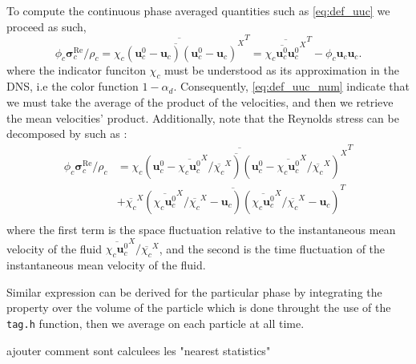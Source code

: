 \documentclass[12pt]{My_preprint}
\newcommand{\avgcond}[1]{\overline{#1}}
\newcommand{\Tavg}[1]{\avgcond{#1}^T}
\newcommand{\Xavg}[1]{\avgcond{#1}^X}
\newcommand{\JL}[1]{\color{red}#1\color{black}}
\renewcommand{\ref}[1]{\autoref{#1}}
\begin{document}
To compute the continuous phase averaged quantities such as \ref{eq:def_uuc} we proceed as such,
\begin{equation}
    \phi_c \bm{\sigma}^{\text{Re}}_c /\rho_c
    = \Tavg{\Xavg{\chi_c (\textbf{u}_c^0 -\textbf{u}_c ) (\textbf{u}_c^0 -\textbf{u}_c)}}
    = \Tavg{\Xavg{\chi_c \textbf{u}_c^0 \textbf{u}_c^0}}
    -  \phi_c  \textbf{u}_c \textbf{u}_c.
    \label{eq:def_uuc_num} 
\end{equation}
where the indicator funciton $\chi_c$ must be understood as its approximation in the DNS, i.e the color function $1 - \alpha_d$. 
Consequently, \ref{eq:def_uuc_num} indicate that we must take the average of the product of the velocities, and then we retrieve the mean velocities' product. 
Additionally,  note that the Reynolds stress can be decomposed by such as : 
\begin{align*}
    \phi_c \bm{\sigma}^{\text{Re}}_c /\rho_c
    &= 
    \Tavg{\Xavg{\chi_c (\textbf{u}_c^0 -\Xavg{\chi_c\textbf{u}_c^0} / \Xavg{\chi_c} ) (\textbf{u}_c^0 -\Xavg{\chi_c\textbf{u}_c^0} / \Xavg{\chi_c} )}}\\
    &+ \Tavg{\Xavg{\chi_c} (\Xavg{\chi_c\textbf{u}_c^0} / \Xavg{\chi_c} - \textbf{u}_c ) (\Xavg{\chi_c\textbf{u}_c^0} / \Xavg{\chi_c} - \textbf{u}_c)}\\
\end{align*}
where the first term is the space fluctuation relative to the instantaneous mean velocity of the fluid $\Xavg{\chi_c\textbf{u}_c^0} / \Xavg{\chi_c}$, and the second is the time fluctuation of the instantaneous mean velocity of the fluid. 

Similar expression can be derived for the particular phase by integrating the property over the volume of the particle which is done throught the use of the \texttt{tag.h} function, then we average on each particle at all time.

\JL{ajouter comment sont calculees les "nearest statistics"}




\end{document}
